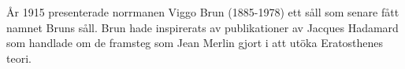 
År 1915 presenterade norrmanen Viggo Brun (1885-1978) ett såll som senare fått namnet Bruns såll. Brun hade inspirerats av publikationer av Jacques Hadamard som handlade om de framsteg som Jean Merlin gjort i att utöka Eratosthenes teori. 